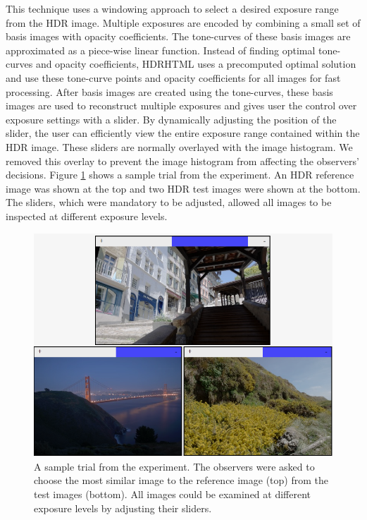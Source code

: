 This technique uses a windowing approach to select a desired exposure range from the HDR image. Multiple exposures are encoded by combining a small set of basis images with opacity coefficients. The tone-curves of these basis images are approximated as a piece-wise linear function. Instead of finding optimal tone-curves and opacity coefficients, HDRHTML uses a precomputed optimal solution and use these tone-curve points and opacity coefficients for all images for fast processing. After basis images are created using the tone-curves, these basis images are used to reconstruct multiple exposures and gives user the control over exposure settings with a slider. By dynamically adjusting the position of the slider, the user can efficiently view the entire exposure range contained within the HDR image. These sliders are normally overlayed with the image histogram. We removed this overlay to prevent the image histogram from affecting the observers’ decisions. Figure \ref{fig:experiment} shows a sample trial from the experiment. An HDR reference image was shown at the top and two HDR test images were shown at the bottom. The sliders, which were mandatory to be adjusted, allowed all images to be inspected at different exposure levels.

\begin{figure}
\begin{center}
\includegraphics[width=\textwidth]{figures/chapter3/experiment.png}
\caption{A sample trial from the experiment. The observers were asked to choose the most similar image to the reference image (top) from the test images (bottom). All images could be examined at different exposure levels by adjusting their sliders.
}
\label{fig:experiment}
\end{center}
\end{figure}

